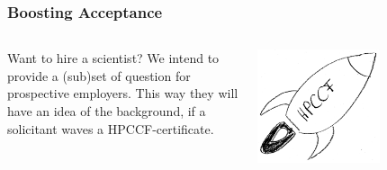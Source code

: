 \begin{frame}
 \frametitle{Boosting Acceptance}
 \begin{columns}
   \begin{column}{.5\textwidth}
     Want to hire a scientist? \newline
     We intend to provide a (sub)set of question for prospective employers. This way they will have an idea of the background, if a solicitant waves a HPCCF-certificate.
   \end{column}
   \begin{column}{.5\textwidth}
       \centering
      \includegraphics[width=0.6\textwidth]{images/hpccf_boost}
    \end{column}
  \end{columns}
\end{frame}

